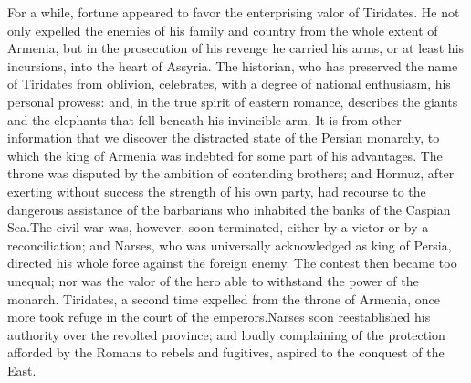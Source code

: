 

For a while, fortune appeared to favor the enterprising valor of
Tiridates. He not only expelled the enemies of his family and
country from the whole extent of Armenia, but in the prosecution
of his revenge he carried his arms, or at least his incursions,
into the heart of Assyria. The historian, who has preserved the
name of Tiridates from oblivion, celebrates, with a degree of
national enthusiasm, his personal prowess: and, in the true
spirit of eastern romance, describes the giants and the elephants
that fell beneath his invincible arm. It is from other
information that we discover the distracted state of the Persian
monarchy, to which the king of Armenia was indebted for some part
of his advantages. The throne was disputed by the ambition of
contending brothers; and Hormuz, after exerting without success
the strength of his own party, had recourse to the dangerous
assistance of the barbarians who inhabited the banks of the
Caspian Sea.\footnotemark[61] The civil war was, however, soon terminated,
either by a victor or by a reconciliation; and Narses, who was
universally acknowledged as king of Persia, directed his whole
force against the foreign enemy. The contest then became too
unequal; nor was the valor of the hero able to withstand the
power of the monarch. Tiridates, a second time expelled from the
throne of Armenia, once more took refuge in the court of the
emperors.\footnotemark[611] Narses soon reëstablished his authority over the
revolted province; and loudly complaining of the protection
afforded by the Romans to rebels and fugitives, aspired to the
conquest of the East.\footnotemark[62]

